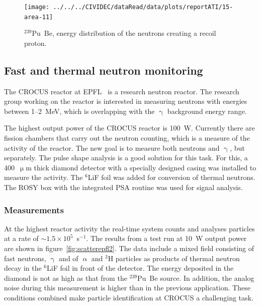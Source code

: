 \begin{figure}[!t]
\centering
\texttt{[image: ../../../CIVIDEC/dataRead/data/plots/reportATI/15-area-11]}
\caption{$^{239}$Pu~Be, energy distribution of the neutrons creating a recoil proton.}
\label{fig:scatterpuarea}
\end{figure}







\newpage\null\thispagestyle{empty}\newpage
\clearpage
\subsection{Fast and thermal neutron monitoring}
The CROCUS reactor at EPFL~\cite{EPFL:00000} is a research neutron reactor. The research group working on the reactor is interested in measuring neutrons with energies between 1--2~MeV, which is overlapping with the $\upgamma$ background energy range.

The highest output power of the CROCUS reactor is 100~W. Currently there are fission chambers that carry out the neutron counting, which is a measure of the activity of the reactor. The new goal is to measure both neutrons and $\upgamma$, but separately. The pulse shape analysis is a good solution for this task. For this, a 400~$\upmu$m thick diamond detector with a specially designed casing was installed to measure the activity. The $^6$LiF foil was added for conversion of thermal neutrons. The ROSY box with the integrated PSA routine was used for signal analysis.

\subsubsection{Measurements}
At the highest reactor activity the real-time system counts and analyses particles at a rate of $\sim1.5\times10^{5}$~s$^{-1}$. The results from a test run at 10~W output power are shown in figure~\ref{fig:scatterepfl2}. The data include a mixed field consisting of fast neutrons, $\upgamma$ and of $\upalpha$ and $^3$H particles as products of thermal neutron decay in the $^6$LiF foil in front of the detector. The energy deposited in the diamond is not as high as that from the $^{239}$Pu~Be source. In addition, the analog noise during this measurement is higher than in the previous application. These conditions combined make particle identification at CROCUS a challenging task.


